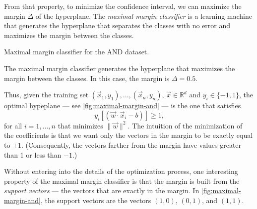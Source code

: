 From that property, to minimize the confidence interval, we can maximize the margin
$\Delta$ of the hyperplane.  The \emph{maximal margin classifier} is a learning machine
that generates the hyperplane that separates the classes with no error and maximizes the
margin between the classes.

\begin{figurebox}[label=fig:maximal-margin-and]{Maximal margin classifier for the AND dataset.}
  \centering
  \tcblower
  The maximal margin classifier generates the hyperplane that maximizes the margin between
  the classes.  In this case, the margin is $\Delta = 0.5$.
\end{figurebox}

Thus, given the training set $(\vec{x}_1, y_1), \dots, (\vec{x}_n, y_n)$, $\vec{x} \in
\mathbb{R}^d$ and $y_i \in \{-1, 1\}$, the optimal hypeplane --- see
\cref{fig:maximal-margin-and} --- is the one that satisfies
\[
  y_i \left[(\vec{w} \cdot \vec{x}_i - b)\right] \geq 1\text{,}
\]
for all $i = 1, \dots, n$ that minimizes $\|\vec{w}\|^2$.  The intuition of the
minimization of the coefficients is that we want only the vectors in the margin to be
exactly equal to $\pm 1$.  (Consequently, the vectors farther from the margin have values
greater than $1$ or less than $-1$.)

Without entering into the details of the optimization process, one interesting property of
the maximal margin classifier is that the margin is built from the \emph{support vectors}
--- the vectors that are exactly in the margin.  In \cref{fig:maximal-margin-and}, the
support vectors are the vectors $(1, 0)$, $(0, 1)$, and $(1, 1)$.

